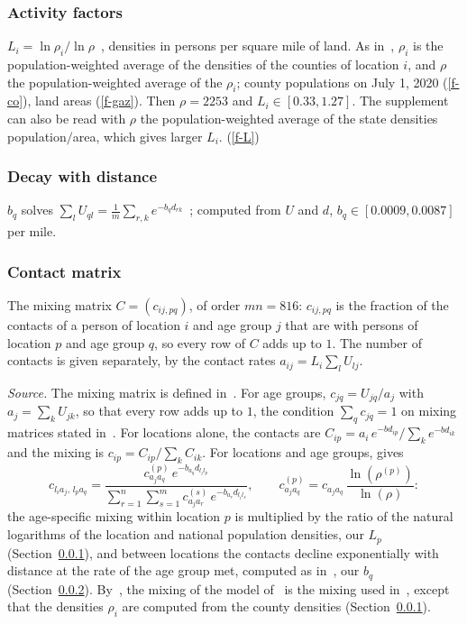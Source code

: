 \documentclass[11pt]{article}
\theoremstyle{remark}
\newcommand{\fref}[1]{\ref{#1}}
\begin{document}
\subsubsection{Activity factors}\label{sec-L}
$L_i=\ln\rho_i/\ln\rho$~\cite[Section~2.4]{2023Glasser_Feng},
densities in persons per square mile of land. As
in~\cite[Supplement, Section~2a]{2026Feng_Day_Glasser}, $\rho_i$ is the
population-weighted average of the densities of the counties of location $i$,
and $\rho$ the population-weighted average of the $\rho_i$; county populations
on July 1, 2020 (\fref{f-co}), land areas (\fref{f-gaz}). Then $\rho=2253$ and
$L_i\in[0.33,1.27]$. The supplement can also be read with $\rho$ the
population-weighted average of the state densities population$/$area, which
gives larger $L_i$. (\fref{f-L})

\subsubsection{Decay with distance}\label{sec-b}
$b_q$ solves
$\sum_lU_{ql}=\frac1m\sum_{r,k}e^{-b_qd_{rk}}$~\cite[Section~2.2.2.2]{2017Feng_Hill_Curns_Glasser};
computed from $U$ and $d$, $b_q\in[0.0009,0.0087]$ per mile.

\subsubsection{Contact matrix}\label{sec-C}
The mixing matrix $C=(c_{ij,pq})$, of order $mn=816$: $c_{ij,pq}$ is the fraction of
the contacts of a person of location $i$ and age group $j$ that are with persons of
location $p$ and age group $q$, so every row of $C$ adds up to $1$. The number of
contacts is given separately, by the contact rates $a_{ij}=L_i\sum_lU_{lj}$.

\emph{Source.} The mixing matrix is defined in~\cite[Section~2.4, pp.~5--6]{2023Glasser_Feng}.
For age groups, $c_{jq}=U_{jq}/a_j$ with $a_j=\sum_kU_{jk}$, so that every row adds up to
$1$, the condition $\sum_qc_{jq}=1$ on mixing matrices stated
in~\cite[Section~2.1]{2017Feng_Hill_Curns_Glasser}. For locations alone, the contacts are
$C_{ip}=a_i\,e^{-bd_{ip}}/\sum_ke^{-bd_{ik}}$ and the mixing is
$c_{ip}=C_{ip}/\sum_kC_{ik}$. For locations and age groups,
\cite[Section~2.4, p.~6]{2023Glasser_Feng} gives
\begin{equation}\label{contacts-glasser}
c_{l_ia_j,\,l_pa_q}=\frac{c^{(p)}_{a_ja_q}\,e^{-b_{a_q}d_{l_il_p}}}
{\sum_{r=1}^{n}\sum_{s=1}^{m}c^{(s)}_{a_ja_r}\,e^{-b_{a_r}d_{l_il_s}}},
\qquad
c^{(p)}_{a_ja_q}=c_{a_ja_q}\,\frac{\ln\left(\rho^{(p)}\right)}{\ln\left(\rho\right)}:
\end{equation}
the age-specific mixing within location $p$ is multiplied by the ratio of the natural
logarithms of the location and national population densities, our $L_p$
(Section~\ref{sec-L}), and between locations the contacts decline exponentially with
distance at the rate of the age group met, computed as
in~\cite{2017Feng_Hill_Curns_Glasser}, our $b_q$ (Section~\ref{sec-b}).
By~\cite[Supplement, Section~2a]{2026Feng_Day_Glasser}, the mixing of the model
of~\cite{2026Feng_Day_Glasser} is the mixing used in~\cite{2023Glasser_Feng}, except that
the densities $\rho_i$ are computed from the county densities (Section~\ref{sec-L}).
\end{document}
